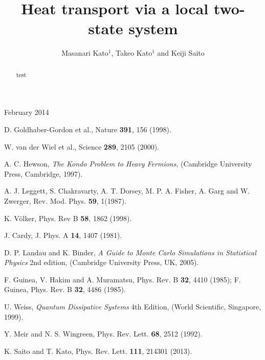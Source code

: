 \documentclass[12pt]{iopart}
\begin{document}
\title{Heat transport via a local two-state system}
\author{Masanari Kato$^1$, Takeo Kato$^1$ and Keiji Saito}
\address{$^1$ IOP Publishing, Temple Circus, Temple Way, Bristol BS1 6HG, UK}
\vspace{10pt}
\begin{indented}
\item[]February 2014
\end{indented}

\begin{abstract}
test
\end{abstract}








\begin{thebibliography}{99}

D. Goldhaber-Gordon et al., Nature {\bf 391}, 156 (1998).

W. van der Wiel et al., Science {\bf 289}, 2105 (2000).

A. C. Hewson, {\em The Kondo Problem to Heavy Fermions}, 
(Cambridge University Press, Cambridge, 1997).

\bibitem{}

A. J. Leggett, S. Chakravarty, A. T. Dorsey, M. P. A. Fisher, A. Garg and W. Zwerger, Rev. Mod. Phys. {\bf 59}, 1(1987).

K. V\"olker, Phys. Rev B {\bf 58}, 1862 (1998).

 J. Cardy, J. Phys. A \textbf{14}, 1407 (1981).

 D. P. Landau and K. Binder, {\it A Guide to Monte Carlo Simulations in Statistical Physics} 2nd edition, (Cambridge University Press, UK, 2005).

F. Guinea, V. Hakim and A. Muramatsu, Phys. Rev. B {\bf 32}, 4410 (1985);
F. Guinea, Phys. Rev. B {\bf 32}, 4486 (1985).

U. Weiss, {\em Quantum Dissipative Systems} 4th Edition, (World Scientific, Singapore, 1999).

Y. Meir and N. S. Wingreen, Phys. Rev. Lett. {\bf 68}, 2512 (1992).

K. Saito and T. Kato, Phys. Rev. Lett. {\bf 111}, 214301 (2013).


\end{thebibliography}
\end{document}
